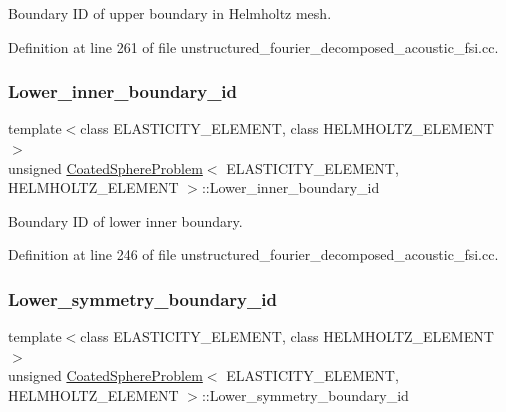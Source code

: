 Boundary ID of upper boundary in Helmholtz mesh. 



Definition at line 261 of file unstructured\+\_\+fourier\+\_\+decomposed\+\_\+acoustic\+\_\+fsi.\+cc.

\mbox{\label{classCoatedSphereProblem_ac5b9684155899ef6c43d73c1dbffc076}} 
\subsubsection{\texorpdfstring{Lower\+\_\+inner\+\_\+boundary\+\_\+id}{Lower\_inner\_boundary\_id}}
{\footnotesize\ttfamily template$<$class E\+L\+A\+S\+T\+I\+C\+I\+T\+Y\+\_\+\+E\+L\+E\+M\+E\+NT, class H\+E\+L\+M\+H\+O\+L\+T\+Z\+\_\+\+E\+L\+E\+M\+E\+NT$>$ \\
unsigned \hyperlink{classCoatedSphereProblem}{Coated\+Sphere\+Problem}$<$ E\+L\+A\+S\+T\+I\+C\+I\+T\+Y\+\_\+\+E\+L\+E\+M\+E\+NT, H\+E\+L\+M\+H\+O\+L\+T\+Z\+\_\+\+E\+L\+E\+M\+E\+NT $>$\+::Lower\+\_\+inner\+\_\+boundary\+\_\+id\hspace{0.3cm}{\ttfamily [private]}}



Boundary ID of lower inner boundary. 



Definition at line 246 of file unstructured\+\_\+fourier\+\_\+decomposed\+\_\+acoustic\+\_\+fsi.\+cc.

\mbox{\label{classCoatedSphereProblem_a9bfac78ea8fcd9d1fc4844e9db66c0d1}} 
\subsubsection{\texorpdfstring{Lower\+\_\+symmetry\+\_\+boundary\+\_\+id}{Lower\_symmetry\_boundary\_id}}
{\footnotesize\ttfamily template$<$class E\+L\+A\+S\+T\+I\+C\+I\+T\+Y\+\_\+\+E\+L\+E\+M\+E\+NT, class H\+E\+L\+M\+H\+O\+L\+T\+Z\+\_\+\+E\+L\+E\+M\+E\+NT$>$ \\
unsigned \hyperlink{classCoatedSphereProblem}{Coated\+Sphere\+Problem}$<$ E\+L\+A\+S\+T\+I\+C\+I\+T\+Y\+\_\+\+E\+L\+E\+M\+E\+NT, H\+E\+L\+M\+H\+O\+L\+T\+Z\+\_\+\+E\+L\+E\+M\+E\+NT $>$\+::Lower\+\_\+symmetry\+\_\+boundary\+\_\+id\hspace{0.3cm}{\ttfamily [private]}}



